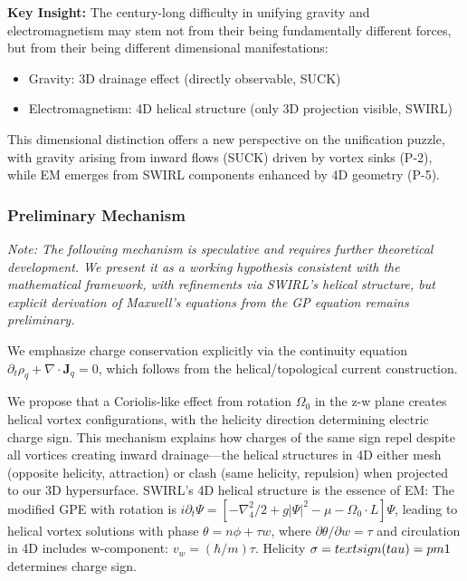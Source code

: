 \textbf{Key Insight:} The century-long difficulty in unifying gravity and electromagnetism may stem not from their being fundamentally different forces, but from their being different dimensional manifestations:
\begin{itemize}
\item Gravity: 3D drainage effect (directly observable, SUCK)
\item Electromagnetism: 4D helical structure (only 3D projection visible, SWIRL)
\end{itemize}
This dimensional distinction offers a new perspective on the unification puzzle, with gravity arising from inward flows (SUCK) driven by vortex sinks (P-2), while EM emerges from SWIRL components enhanced by 4D geometry (P-5).

\subsubsection{Preliminary Mechanism}
\textit{Note: The following mechanism is speculative and requires further theoretical development. We present it as a working hypothesis consistent with the mathematical framework, with refinements via SWIRL's helical structure, but explicit derivation of Maxwell's equations from the GP equation remains preliminary.}

We emphasize charge conservation explicitly via the continuity equation $\partial_t \rho_q + \nabla\!\cdot \mathbf J_q = 0$, which follows from the helical/topological current construction.

We propose that a Coriolis-like effect from rotation $\Omega_0$ in the z-w plane creates helical vortex configurations, with the helicity direction determining electric charge sign. This mechanism explains how charges of the same sign repel despite all vortices creating inward drainage---the helical structures in 4D either mesh (opposite helicity, attraction) or clash (same helicity, repulsion) when projected to our 3D hypersurface. SWIRL's 4D helical structure is the essence of EM: The modified GPE with rotation is $i\partial_t\Psi = [-\nabla_4^2/2 + g|\Psi|^2 - \mu - \Omega_0\cdot L]\Psi$, leading to helical vortex solutions with phase $\theta = n\phi + \tau w$, where $\partial\theta/\partial w = \tau$ and circulation in 4D includes w-component: $v_w = (\hbar/m)\tau$. Helicity $\sigma = \\text{sign}(\\tau) = \\pm1$ determines charge sign.

